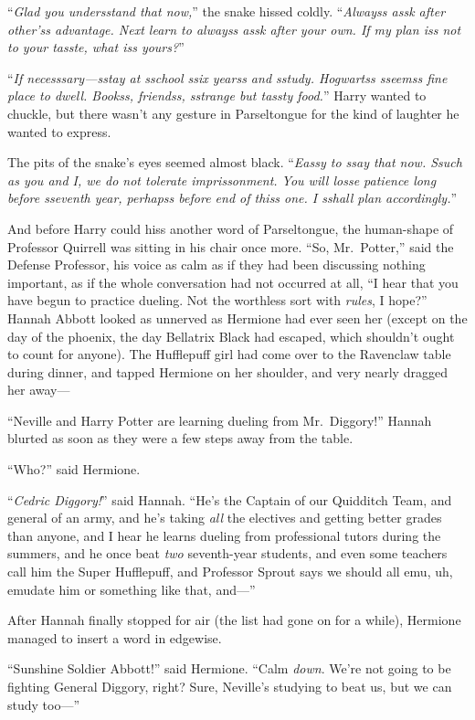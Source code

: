 “\emph{Glad you undersstand that now,}” the snake hissed coldly. “\emph{Alwayss assk after other’ss advantage. Next learn to alwayss assk after your own. If my plan iss not to your tasste, what iss yours?}”

“\emph{If necesssary—sstay at sschool ssix yearss and sstudy. Hogwartss sseemss fine place to dwell. Bookss, friendss, sstrange but tassty food.}” Harry wanted to chuckle, but there wasn’t any gesture in Parseltongue for the kind of laughter he wanted to express.

The pits of the snake’s eyes seemed almost black. “\emph{Eassy to ssay that now. Ssuch as you and I, we do not tolerate imprissonment. You will losse patience long before sseventh year, perhapss before end of thiss one. I sshall plan accordingly.}”

And before Harry could hiss another word of Parseltongue, the human-shape of Professor Quirrell was sitting in his chair once more. “So, Mr.~Potter,” said the Defense Professor, his voice as calm as if they had been discussing nothing important, as if the whole conversation had not occurred at all, “I hear that you have begun to practice dueling. Not the worthless sort with \emph{rules}, I hope?”
\sbreak
Hannah Abbott looked as unnerved as Hermione had ever seen her (except on the day of the phoenix, the day Bellatrix Black had escaped, which shouldn’t ought to count for anyone). The Hufflepuff girl had come over to the Ravenclaw table during dinner, and tapped Hermione on her shoulder, and very nearly dragged her away—

“Neville and Harry Potter are learning dueling from Mr.~Diggory!” Hannah blurted as soon as they were a few steps away from the table.

“Who?” said Hermione.

“\emph{Cedric Diggory!}” said Hannah. “He’s the Captain of our Quidditch Team, and general of an army, and he’s taking \emph{all} the electives and getting better grades than anyone, and I hear he learns dueling from professional tutors during the summers, and he once beat \emph{two} seventh-year students, and even some teachers call him the Super Hufflepuff, and Professor Sprout says we should all emu, uh, emudate him or something like that, and—”

After Hannah finally stopped for air (the list had gone on for a while), Hermione managed to insert a word in edgewise.

“Sunshine Soldier Abbott!” said Hermione. “Calm \emph{down}. We’re not going to be fighting General Diggory, right? Sure, Neville’s studying to beat us, but we can study too—”

